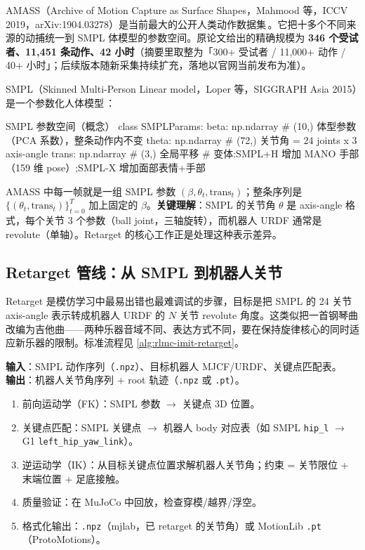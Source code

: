 AMASS（Archive of Motion Capture as Surface Shapes，Mahmood 等，ICCV 2019，arXiv:1904.03278）是当前最大的公开人类动作数据集\,\cite{mahmood2019amass}。它把十多个不同来源的动捕统一到 SMPL 体模型的参数空间。原论文给出的精确规模为 \textbf{346 个受试者、11{,}451 条动作、42 小时}（摘要里取整为「300+ 受试者 / 11{,}000+ 动作 / 40+ 小时」；后续版本随新采集持续扩充，落地以官网当前发布为准）。

SMPL（Skinned Multi-Person Linear model，Loper 等，SIGGRAPH Asia 2015）是一个参数化人体模型\,\cite{loper2015smpl}：

\begin{codebox}[Python]{SMPL 参数空间（概念）}
class SMPLParams:
    beta:  np.ndarray  # (10,)  体型参数（PCA 系数），整条动作内不变
    theta: np.ndarray  # (72,)  关节角 = 24 joints x 3 axis-angle
    trans: np.ndarray  # (3,)   全局平移
# 变体:SMPL+H 增加 MANO 手部（159 维 pose）;SMPL-X 增加面部表情+手部
\end{codebox}

AMASS 中每一帧就是一组 SMPL 参数 $(\beta,\theta_t,\text{trans}_t)$；整条序列是 $\{(\theta_t,\text{trans}_t)\}_{t=0}^{T}$ 加上固定的 $\beta$。\textbf{关键理解}：SMPL 的关节角 $\theta$ 是 axis-angle 格式，每个关节 3 个参数（ball joint，三轴旋转），而机器人 URDF 通常是 revolute（单轴）。Retarget 的核心工作正是处理这种表示差异。

\subsection{Retarget 管线：从 SMPL 到机器人关节}
\label{sec:rlmc-imit-data-retarget}

Retarget 是模仿学习中最易出错也最难调试的步骤，目标是把 SMPL 的 24 关节 axis-angle 表示转成机器人 URDF 的 $N$ 关节 revolute 角度。这类似把一首钢琴曲改编为吉他曲——两种乐器音域不同、表达方式不同，要在保持旋律核心的同时适应新乐器的限制。标准流程见 \cref{alg:rlmc-imit-retarget}。

\begin{algo}\label{alg:rlmc-imit-retarget}
\textbf{输入}：SMPL 动作序列（\texttt{.npz}）、目标机器人 MJCF/URDF、关键点匹配表。\\
\textbf{输出}：机器人关节角序列 + root 轨迹（\texttt{.npz} 或 \texttt{.pt}）。
\begin{enumerate}
  \item 前向运动学（FK）：SMPL 参数 $\to$ 关键点 3D 位置。
  \item 关键点匹配：SMPL 关键点 $\to$ 机器人 body 对应表（如 SMPL \texttt{hip\_l} $\to$ G1 \texttt{left\_hip\_yaw\_link}）。
  \item 逆运动学（IK）：从目标关键点位置求解机器人关节角；约束 = 关节限位 + 末端位置 + 足底接触。
  \item 质量验证：在 MuJoCo 中回放，检查穿模/越界/浮空。
  \item 格式化输出：\texttt{.npz}（mjlab，已 retarget 的关节角）或 MotionLib \texttt{.pt}（ProtoMotions）。
\end{enumerate}
\end{algo}

